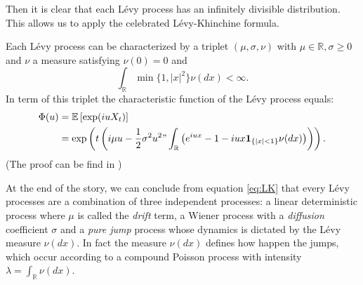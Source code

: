 Then it is clear that each L\'evy process has an infinitely divisible distribution. This allows us to apply the celebrated L\'evy-Khinchine formula. 

\begin{thm}
Each L\'evy process can be characterized by a triplet $(\mu,\sigma,\nu)$ with $\mu \in \mathbb{R},\sigma \geq 0$ and $\nu$ a measure satisfying $\nu(0) = 0$ and
$$\int_\mathbb{R} \min\{1,|x|^2\}\nu(dx)<\infty.$$
In term of this triplet the characteristic function of the L\'evy process equals:
\begin{align}\label{eq:LK}
\Phi(u) &= \mathbb{E}\left[\exp(i u X_t)\right]\nonumber\\
&= \exp\left(t\left(i\mu u -\frac{1}{2}\sigma^2u^2"\int_\mathbb{R}\left(e^{iux}-1-iux\mathbf{1}_{\{|x|<1\}}\nu(dx)\right)\right)\right).
\end{align}
(The proof can be find in \citeauthor{Tankov} \citeyearpar{Tankov})
\end{thm}

At the end of the story, we can conclude from equation \eqref{eq:LK} that every L\'evy processes are a combination of three independent processes: a linear deterministic process where $\mu$ is called the \textit{drift} term, a Wiener process with a \textit{diffusion} coefficient $\sigma$ and a \textit{pure jump} process whose dynamics is dictated by the L\'evy measure $\nu(dx)$. In fact the measure $\nu(dx)$ defines how happen the jumps, which occur according to a compound Poisson process with intensity $\lambda = \int_\mathbb{R}\nu(dx)$.

